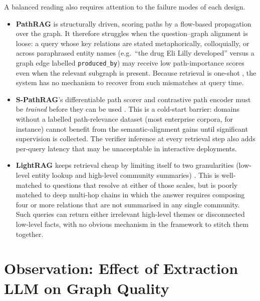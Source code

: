 \documentclass[12pt,a4paper,oneside]{report}
\begin{document}
A balanced reading also requires attention to the failure modes of
each design.
\begin{itemize}[leftmargin=2em,itemsep=2pt]
    \item \textbf{PathRAG} is structurally driven, scoring paths by
          a flow-based propagation over the graph. It therefore
          struggles when the question--graph alignment is loose: a
          query whose key relations are stated metaphorically,
          colloquially, or across paraphrased entity names
          (e.g.\ ``the drug Eli Lilly developed'' versus a graph
          edge labelled \texttt{produced\_by}) may receive low
          path-importance scores even when the relevant subgraph is
          present. Because retrieval is one-shot
          \citep{chen2025pathrag}, the system has no mechanism to
          recover from such mismatches at query time.
    \item \textbf{S-PathRAG}'s differentiable path scorer and
          contrastive path encoder must be \emph{trained} before
          they can be used \citep{fu2026spathrag}. This is a
          cold-start barrier: domains without a labelled
          path-relevance dataset (most enterprise corpora,
          for instance) cannot benefit from the semantic-alignment
          gains until significant supervision is collected. The
          verifier inference at every retrieval step also adds
          per-query latency that may be unacceptable in
          interactive deployments.
    \item \textbf{LightRAG} keeps retrieval cheap by limiting itself
          to two granularities (low-level entity lookup and
          high-level community summaries) \citep{guo2025lightrag}.
          This is well-matched to questions that resolve at
          either of those scales, but is poorly matched to deep
          multi-hop chains in which the answer requires composing
          four or more relations that are not summarised in any
          single community. Such queries can return either
          irrelevant high-level themes or disconnected low-level
          facts, with no obvious mechanism in the framework to
          stitch them together.
\end{itemize}

\section{Observation: Effect of Extraction LLM on Graph Quality}
\label{sec:empirical_observation}
\end{document}
